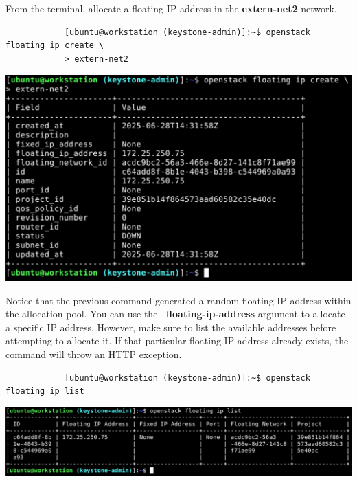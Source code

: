 \documentclass[letterpaper, 12pt]{article}
\begin{document}
\begin{enumerate}
    \begin{labstep}
        From the terminal, allocate a floating IP address in the \textbf{extern-net2} network.
        \begin{lstlisting}
            [ubuntu@workstation (keystone-admin)]:~$ openstack floating ip create \
            > extern-net2
        \end{lstlisting}

        \begin{center}
            \includegraphics[width=\linewidth]{images/part3/step14.png}
        \end{center}
    \end{labstep}

    \begin{labstep}
        Notice that the previous command generated a random floating IP address within the allocation pool.
        You can use the \textbf{--floating-ip-address} argument to allocate a specific IP address.
        However, make sure to list the available addresses before attempting to allocate it.
        If that particular floating IP address already exists, the command will throw an HTTP exception.
        \begin{lstlisting}
            [ubuntu@workstation (keystone-admin)]:~$ openstack floating ip list
        \end{lstlisting}

        \begin{center}
            \includegraphics[width=\linewidth]{images/part3/step15.png}
        \end{center}
    \end{labstep}


\end{enumerate}
\end{document}
